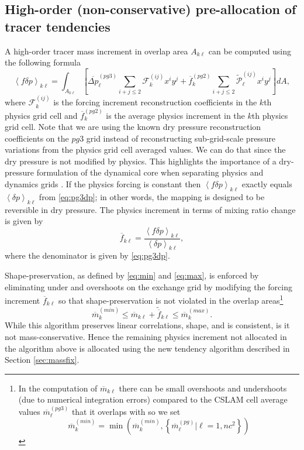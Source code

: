 \documentclass[draft,linenumbers]{agujournal}
\begin{document}
\subsection{High-order (non-conservative) pre-allocation of tracer tendencies}
A high-order tracer mass increment in overlap area $A_{k\ell}$ can be computed using the following formula
\begin{equation}
\label{eq:mp3}
\left< f\delta p\right>_{k\ell}=\int_{A_{k\ell}}\left[ \overline{\Delta p}_\ell^{(pg3)}\sum_{i+j\le 2}{\mathcal{F}}^{(ij)}_k x^{i}y^{j}+{\overline{f}}_k^{(pg2)}\sum_{i+j\le 2}{\widetilde{{\mathcal{P}}}}^{(ij)}_\ell x^{i}y^{j}\right] dA,
\end{equation}
where $\mathcal{F}^{(ij)}_k$ is the forcing increment reconstruction coefficients in the $k$th physics grid cell and ${\overline{f}}_k^{(pg2)}$ is the average physics increment in the $k$th physics grid cell. Note that we are using the known dry pressure reconstruction coefficients on the $pg3$ grid instead of reconstructing sub-grid-scale pressure variations from the physics grid cell averaged values. We can do that since the dry pressure is not modified by physics. This highlights the importance of a dry-pressure formulation of the dynamical core when separating physics and dynamics grids \citep{LetAl2018JAMES}. If the physics forcing is constant then $\left< f\delta p\right>_{k\ell}$ exactly equals $\left<\delta p\right>_{k\ell}$ from \eqref{eq:pg3dp}; in other words, the mapping is designed to be reversible in dry pressure. The physics increment in terms of mixing ratio change is given by
\begin{equation}
\label{eq:pg3fq}
\overline{f}_{k\ell}=\frac{\left< f\delta p\right>_{k\ell}}{\left<\delta p\right>_{k\ell}},
\end{equation}
where the denominator is given by \eqref{eq:pg3dp}.

Shape-preservation, as defined by \eqref{eq:min} and \eqref{eq:max}, is enforced by eliminating under and overshoots on the exchange grid by modifying the forcing increment $\overline{f}_{k\ell}$ so that shape-preservation is not violated in the overlap areas{\footnote{In the computation of $\overline{m}_{k\ell}$ there can be small overshoots and undershoots (due to numerical integration errors) compared to the CSLAM cell average values $\overline{m}^{(pg3)}_\ell$ that it overlaps with so we set
\begin{equation}
\overline{m}_k^{(min)}=\min \left( \overline{m}_k^{(min)},\left\{ \overline{m}^{(pg)}_\ell |\ell=1,nc^2\right\} \right)
\end{equation}}}
\begin{equation}
\overline{m}_k^{(min)} \le \overline{m}_{k\ell}+\widetilde{\overline{f}}_{k\ell} \le \overline{m}_k^{(max)}.
\end{equation}
While this algorithm preserves linear correlations, shape, and is consistent, is it not mass-conservative. Hence the remaining physics increment not allocated in the algorithm above is allocated using the new tendency algorithm described in Section \ref{sec:massfix}.
\end{document}
